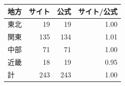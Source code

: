 \begin{tabular}{lrrr}
\toprule
地方 & サイト & 公式 & サイト/公式 \\
\midrule
東北 & 19 & 19 & 1.00 \\
関東 & 135 & 134 & 1.01 \\
中部 & 71 & 71 & 1.00 \\
近畿 & 18 & 19 & 0.95 \\
\midrule
計 & 243 & 243 & 1.00 \\
\bottomrule
\end{tabular}
